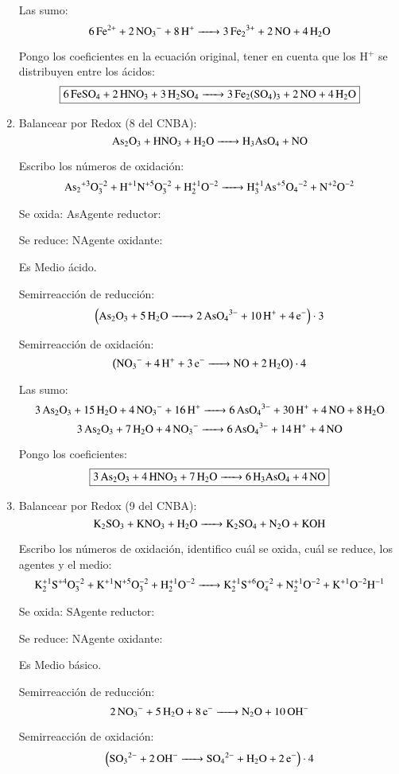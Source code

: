 \begin{enumerate}
Las sumo:
$$
\ce{6Fe^{2+} + 2NO_3^- + 8H^+ -> 3Fe_2^{3+} + 2NO + 4H_2O}
$$

Pongo los coeficientes en la ecuación original, tener en cuenta que los H$^+$ se distribuyen entre los ácidos:
$$\fbox{\ce{6FeSO_4 + 2HNO_3 + 3H_2SO_4 -> 3Fe_2(SO4)3 + 2NO + 4H2O}}$$


\item Balancear por Redox (8 del CNBA):
$$\ce{
As2O3 + HNO3 + H2O -> H3AsO4 + NO
}$$

Escribo los números de oxidación:
$$\ce{
As2^{+3}O^{-2}3 + H^{+1}N^{+5}O^{-2}3 + H^{+1}2O^{-2} -> H^{+1}3As^{+5}O4^{-2} + N^{+2}O^{-2}
}$$

\hfil Se oxida: As\hfil Agente reductor: \hfil

\hfil Se reduce: N\hfil Agente oxidante: \hfil

Es Medio ácido.

\begin{multicols}{2}
Semirreacción de reducción:
$$\left(\ce{
As2O3 + 5H2O -> 2AsO4^{3-} + 10H^+ +4e^-
}\right)\cdot 3$$

Semirreacción de oxidación:
$$\left(\ce{
NO_3^{-} + 4H^+ +3e^- -> NO + 2H2O
}\right)\cdot 4$$
\end{multicols}

Las sumo:
$$\ce{
3As2O3 + 15H2O + 4NO3^- + 16H^+ -> 6AsO_4^{3-} + 30H^+ + 4NO + 8 H2O
}$$
$$\ce{
3As2O3 + 7H2O + 4NO3^- -> 6AsO_4^{3-} + 14H^+ + 4NO
}$$

Pongo los coeficientes:
$$\fbox{\ce{
3As2O3 + 4HNO3 + 7H2O -> 6H3AsO4 + 4NO}}$$


\newpage
\item Balancear por Redox (9 del CNBA):
$$\ce{K2SO3 + KNO3 + H2O ->
K2SO4 + N2O + KOH}$$

Escribo los números de oxidación, identifico cuál se oxida, cuál se reduce, los agentes y el medio:
$$\ce{
K^{+1}2S^{+4}O^{-2}3 + K^{+1}N^{+5}O^{-2}3 + H^{+1}2O^{-2} ->
K^{+1}2S^{+6}O^{-2}4 + N^{+1}2O^{-2} + K^{+1}O^{-2}H^{-1}
}$$

\hfil Se oxida: S\hfil Agente reductor: \hfil

\hfil Se reduce: N\hfil Agente oxidante: \hfil

Es Medio básico.

\begin{multicols}{2}
Semirreacción de reducción:
$$\ce{
2NO_3^{-} + 5 H2O + 8e^- ->
N2O + 10OH^-
}$$

Semirreacción de oxidación:
$$\left(\ce{
SO3^{2-} + 2OH^- ->
SO4^{2-} + H2O + 2e^-
}\right)\cdot 4$$
\end{multicols}


\end{enumerate}
